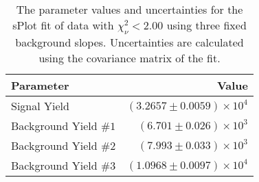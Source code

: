 
\begin{table}[ht]
    \begin{center}
        \begin{tabular}{lr}\toprule
            Parameter & Value \\\midrule
            Signal Yield & $(3.2657 \pm 0.0059) \times 10^{4}$ \\
            Background Yield $\#1$ & $(6.701 \pm 0.026) \times 10^{3}$ \\
            Background Yield $\#2$ & $(7.993 \pm 0.033) \times 10^{3}$ \\
            Background Yield $\#3$ & $(1.0968 \pm 0.0097) \times 10^{4}$ \\\bottomrule
        \end{tabular}
        \caption{The parameter values and uncertainties for the sPlot fit of data with $\chi^2_\nu < 2.00$ using three fixed background slopes. Uncertainties are calculated using the covariance matrix of the fit.}\label{tab:splot-fit-results-chisqdof-2.00-fixed-3}
    \end{center}
\end{table}
